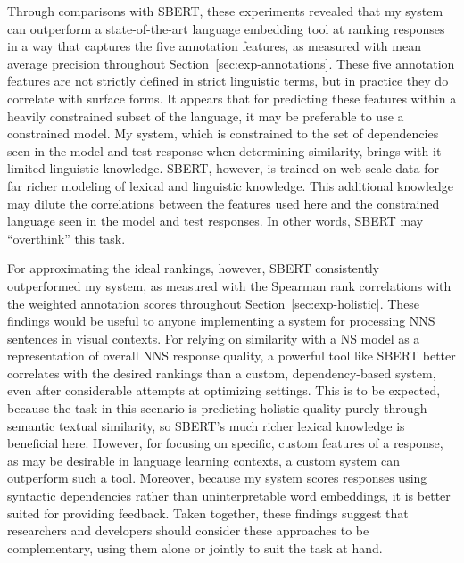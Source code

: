 Through comparisons with SBERT, these experiments revealed that my system can outperform a state-of-the-art language embedding tool at ranking responses in a way that captures the five annotation features, as measured with mean average precision throughout Section~\ref{sec:exp-annotations}. 
These five annotation features are not strictly defined in strict linguistic terms, but in practice they do correlate with surface forms. It appears that for predicting these features within a heavily constrained subset of the language, it may be preferable to use a constrained model. My system, which is constrained to the set of dependencies seen in the model and test response when determining similarity, brings with it limited linguistic knowledge. SBERT, however, is trained on web-scale data for far richer modeling of lexical and linguistic knowledge. This additional knowledge may dilute the correlations between the features used here and the constrained language seen in the model and test responses. In other words, SBERT may ``overthink'' this task.

For approximating the ideal rankings, however, SBERT consistently outperformed my system, as measured with the Spearman rank correlations with the weighted annotation scores throughout Section~\ref{sec:exp-holistic}. These findings would be useful to anyone implementing a system for processing NNS sentences in visual contexts. For relying on similarity with a NS model as a representation of overall NNS response quality, a powerful tool like SBERT better correlates with the desired rankings than a custom, dependency-based system, even after considerable attempts at optimizing settings. This is to be expected, because the task in this scenario is predicting holistic quality  purely through semantic textual similarity, so SBERT's much richer lexical knowledge is beneficial here. However, for focusing on specific, custom features of a response, as may be desirable in language learning contexts, a custom system can outperform such a tool. Moreover, because my system scores responses using syntactic dependencies rather than uninterpretable word embeddings, it is better suited for providing feedback. Taken together, these findings suggest that researchers and developers should consider these approaches to be complementary, using them alone or jointly to suit the task at hand. 


